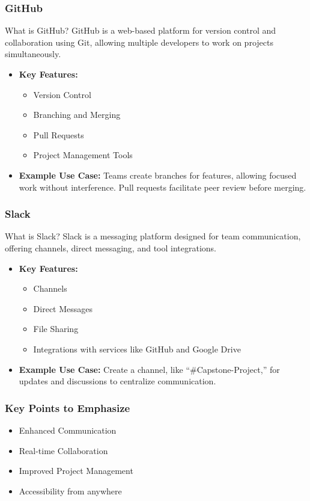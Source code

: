 \documentclass[aspectratio=169]{beamer}
\begin{document}
\begin{frame}[fragile]
    \frametitle{GitHub}
    \begin{block}{What is GitHub?}
        GitHub is a web-based platform for version control and collaboration using Git, allowing multiple developers to work on projects simultaneously.
    \end{block}
    \begin{itemize}
        \item \textbf{Key Features:}
        \begin{itemize}
            \item Version Control
            \item Branching and Merging
            \item Pull Requests
            \item Project Management Tools
        \end{itemize}
        \item \textbf{Example Use Case:} Teams create branches for features, allowing focused work without interference. Pull requests facilitate peer review before merging.
    \end{itemize}
\end{frame}

\begin{frame}[fragile]
    \frametitle{Slack}
    \begin{block}{What is Slack?}
        Slack is a messaging platform designed for team communication, offering channels, direct messaging, and tool integrations.
    \end{block}
    \begin{itemize}
        \item \textbf{Key Features:}
        \begin{itemize}
            \item Channels
            \item Direct Messages
            \item File Sharing
            \item Integrations with services like GitHub and Google Drive
        \end{itemize}
        \item \textbf{Example Use Case:} Create a channel, like “\#Capstone-Project,” for updates and discussions to centralize communication.
    \end{itemize}
\end{frame}

\begin{frame}[fragile]
    \frametitle{Key Points to Emphasize}
    \begin{itemize}
        \item Enhanced Communication
        \item Real-time Collaboration
        \item Improved Project Management
        \item Accessibility from anywhere
    \end{itemize}
\end{frame}
\end{document}
